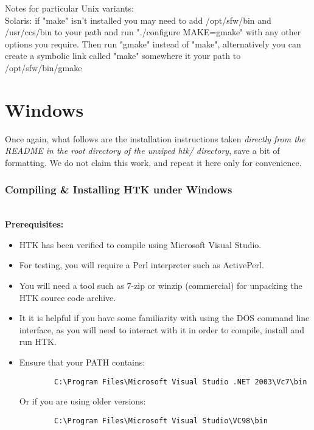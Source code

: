 \documentclass{wileySev}
\begin{document}
Notes for particular Unix variants:\\
Solaris: if "make" isn't installed you may need to add /opt/sfw/bin
and /usr/ccs/bin to your path and run "./configure MAKE=gmake" with
any other options you require.  Then run "gmake" instead of "make",
alternatively you can create a symbolic link called "make" somewhere
it your path to /opt/sfw/bin/gmake

\section{Windows}
Once again, what follows are the installation instructions taken \textit{directly from the README in the root directory of the unziped htk/ directory}, save a bit of formatting. We do not claim this work, and repeat it here only for convenience.\\
\subsubsection{Compiling \& Installing HTK under Windows}~\\

\textbf{Prerequisites:}
\begin{itemize}
	\item HTK has been verified to compile using Microsoft Visual Studio.
	\item For testing, you will require a Perl interpreter such as ActivePerl. 
	\item You will need a tool such as 7-zip or winzip (commercial) for unpacking the HTK source code archive.
	\item It it is helpful if you have some familiarity with using the DOS command line interface, as you will need to interact with it in order to compile, install and run HTK.
	\item Ensure that your PATH contains:
		\begin{verbatim}
		C:\Program Files\Microsoft Visual Studio .NET 2003\Vc7\bin
		\end{verbatim}
		Or if you are using older versions:
		\begin{verbatim}
		C:\Program Files\Microsoft Visual Studio\VC98\bin
		\end{verbatim}
\end{itemize}
\end{document}
